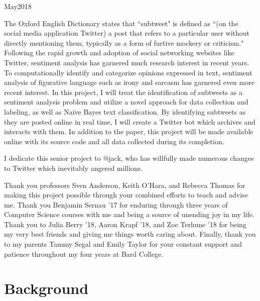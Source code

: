 \documentclass[11pt, twoside, reqno]{book}
\begin{document}
    {May}{2018}

\abstr

The Oxford English Dictionary states that ``subtweet" is defined as ``(on the social media application Twitter) a post that refers to a particular user without directly mentioning them, typically as a form of furtive mockery or criticism." Following the rapid growth and adoption of social networking websites like Twitter, sentiment analysis has garnered much research interest in recent years. To computationally identify and categorize opinions expressed in text, sentiment analysis of figurative language such as irony and sarcasm has garnered even more recent interest. In this project, I will treat the identification of subtweets as a sentiment analysis problem and utilize a novel approach for data collection and labeling, as well as Naive Bayes text classification. By identifying subtweets as they are posted online in real time, I will create a Twitter bot which archives and interacts with them. In addition to the paper, this project will be made available online with its source code and all data collected during its completion.

\tableofcontents

\dedic

I dedicate this senior project to @jack, who has willfully made numerous changes to Twitter which inevitably angered millions.

\acknowl

Thank you professors Sven Anderson, Keith O'Hara, and Rebecca Thomas for making this project possible through your combined efforts to teach and advise me. Thank you Benjamin Sernau '17 for enduring through three years of Computer Science courses with me and being a source of unending joy in my life. Thank you to Julia Berry '18, Aaron Krapf '18, and Zoe Terhune '18 for being my very best friends and giving me things worth caring about. Finally, thank you to my parents Tammy Segal and Emily Taylor for your constant support and patience throughout my four years at Bard College. 

\startmain


\intro

\section{Background}
\label{background}
\end{document}
